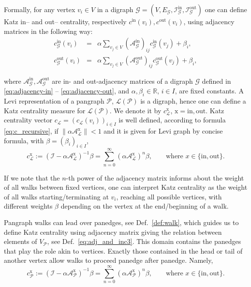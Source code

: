 \documentclass[a4paper,12pt]{article}
\theoremstyle{definition}
\theoremstyle{remark}
\newcommand{\mG}{\mathcal{G}}
\newcommand{\mP}{\mathcal{P}}
\newcommand{\mL}{\mathcal{L}}
\newcommand{\tin}{\mathrm{in}}
\newcommand{\out}{\mathrm{out}}
\newcommand{\inci}{\mathcal{I}^{\tin}}
\newcommand{\inco}{\mathcal{I}^{\out}}
\begin{document}
Formally, for any vertex $v_i\in V$ in a digraph $\mathcal{G}=(V,E_{\mG}, \inci_{\mG},\inco_{\mG})$ one can define Katz in-- and out-- centrality, respectively $c^{\tin}(v_i), c^{\out}(v_i)$, using adjacency matrices in the following way:
\begin{eqnarray}\label{eq:c_recursive}
   c_{\mG}^{\textrm{in}}(v_i)&=&\alpha \sum_{v_j\in V}  (\mathcal{A}^{\textrm{in}}_{\mG})_{ij}  c_{\mG}^{\textrm{in}}(v_j) + \beta_i,\\
   c_{\mG}^{\textrm{out}}(v_i)&=&\alpha \sum_{v_j\in V}  (\mathcal{A}^{\textrm{out}}_{\mG})_{ij}  c_{\mG}^{\textrm{out}}(v_j) + \beta_i,
\end{eqnarray}

\noindent where $\mathcal{A}_{\mG}^{\tin},\mathcal{A}_{\mG}^{\out}$ are in- and out-adjacency matrices of a digraph $\mathcal{G}$ defined in \eqref{eq:adjacency-in} -- \eqref{eq:adjacency-out}, and $\alpha, \beta_i\in \mathbb{R}$, $i\in I$, are fixed constants. A Levi representation of a pangraph $\mP$, $\mL(\mP)$ is a digraph, hence one can define a Katz centrality measure for $\mL(\mP)$. We denote it by $c_{\mL}^{\textrm{x}}$, $\textrm{x}=\tin, \out$. Katz centrality vector $c_{\mL}=(c_{\mL}(v_i))_{i\in I}$ is well defined, according to formula \eqref{eq:c_recursive}, if $\|\alpha\mathcal{A}_{\mL}^{\textrm{x}}\|<1$ and it is given for Levi graph by concise formula, with $\beta=(\beta_i)_{i\in I}$,
\begin{equation}\label{eq:c_concise}
c_{\mL}^{\textrm{x}}:=(\mathcal{I}-\alpha\mathcal{A}_{\mL}^{\textrm{x}})^{-1}\beta=\sum_{n=0}^{\infty}(\alpha\mathcal{A}_{\mL}^{\textrm{x}})^n\beta,\qquad \textrm{where }x\in \{\tin,\out\}.
\end{equation}

If we note that the $n$-th power of the adjacency matrix informs about the weight of all walks between fixed vertices, one can interpret Katz centrality as the weight of all walks starting/terminating at $v_i$, reaching all possible vertices, with different weights $\beta$ depending on the vertex at the end/beginning of a walk.

Pangraph walks can lead over panedges, see Def.~\ref{def:walk}, which guides us to define Katz centrality using adjacency matrix giving the relation between elements of $V_{\mP}$, see Def.~\ref{eq:adj_and_inc3}. This domain contains the panedges that play the role akin to vertices. Exactly those contained in the head or tail of another vertex allow walks to proceed panedge after panedge. Namely,
\begin{equation}\label{katz_pangraph_adjacency}
c_{\mP}^{\textrm{x}}:=(\mathcal{I}-\alpha\mathcal{A}_{\mP}^{\textrm{x}})^{-1}\beta=\sum_{n=0}^{\infty}(\alpha\mathcal{A}_{\mP}^{\textrm{x}})^n\beta,\qquad \textrm{where }x\in \{\tin,\out\}.
\end{equation}
\end{document}
